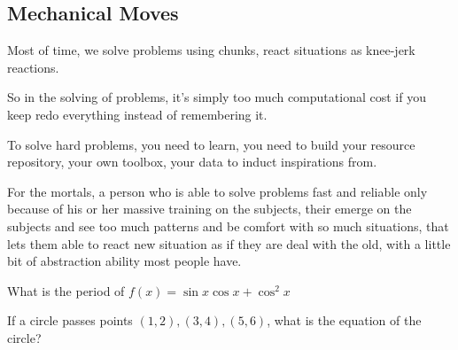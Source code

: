 \subsection{Mechanical Moves}

Most of time, we solve problems using chunks, react situations as knee-jerk reactions.

So in the solving of problems, it's simply too much computational cost if you keep redo everything instead of remembering it.

To solve hard problems, you need to learn, you need to build your resource repository, your own toolbox, your data to induct inspirations from.

For the mortals, a person who is able to solve problems fast and reliable only because of his or her massive training on the subjects, their emerge on the subjects and see too much patterns and be comfort with so much situations, that lets them able to react new situation as if they are deal with the old, with a little bit of abstraction ability most people have.


\begin{example}
  What is the period of $f(x) = \sin x \cos x + \cos^2 x$
\end{example}

\begin{example}
  If a circle passes points $(1,2), (3,4), (5,6)$, what is the equation of the circle?
\end{example}
